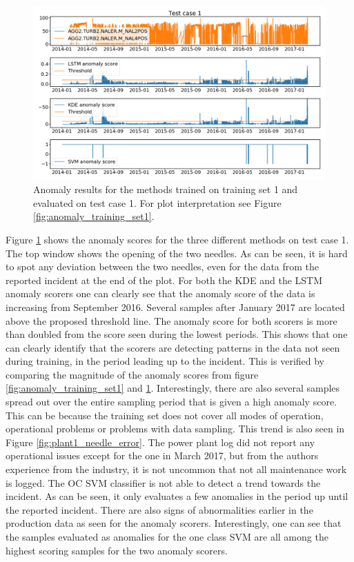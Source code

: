        \begin{figure}
            \centering
            \includegraphics[width = \textwidth]{report/figures/analysis/plant1_training/production_data_anomaly.png}
            \caption{Anomaly results for the methods trained on training set 1 and evaluated on test case 1. For plot interpretation see Figure \ref{fig:anomaly_training_set1}.}
            \label{fig:anomaly_plant_1_train_production}
        \end{figure}
        Figure \ref{fig:anomaly_plant_1_train_production} shows the anomaly scores for the three different methods on test case 1. The top window shows the opening of the two needles. As can be seen, it is hard to spot any deviation between the two needles, even for the data from the reported incident at the end of the plot. For both the KDE and the LSTM anomaly scorers one can clearly see that the anomaly score of the data is increasing from September 2016. Several samples after January 2017 are located above the proposed threshold line. The anomaly score for both scorers is more than doubled from the score seen during the lowest periods. This shows that one can clearly identify that the scorers are detecting patterns in the data not seen during training, in the period leading up to the incident. This is verified by comparing the magnitude of the anomaly scores from figure \ref{fig:anomaly_training_set1} and \ref{fig:anomaly_plant_1_train_production}. Interestingly, there are also several samples spread out over the entire sampling period that is given a high anomaly score. This can be because the training set does not cover all modes of operation, operational problems or problems with data sampling. This trend is also seen in Figure \ref{fig:plant1_needle_error}. The power plant log did not report any operational issues except for the one in March 2017, but from the authors experience from the industry, it is not uncommon that not all maintenance work is logged. The OC SVM classifier is not able to detect a trend towards the incident. As can be seen, it only evaluates a few anomalies in the period up until the reported incident. There are also signs of abnormalities earlier in the production data as seen for the anomaly scorers. Interestingly, one can see that the samples evaluated as anomalies for the one class SVM are all among the highest scoring samples for the two anomaly scorers. 
        
